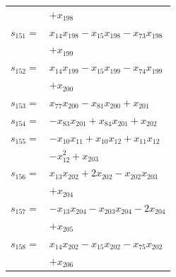 \begin{longtable}{@{}r@{\;}l@{}}
 & \(\displaystyle +x_{198}\) \\[3pt]
\(s_{151}=\) & \(\displaystyle x_{14}x_{198} -x_{15}x_{198} -x_{73}x_{198}\) \\
 & \(\displaystyle +x_{199}\) \\[3pt]
\(s_{152}=\) & \(\displaystyle x_{14}x_{199} -x_{15}x_{199} -x_{74}x_{199}\) \\
 & \(\displaystyle +x_{200}\) \\[3pt]
\(s_{153}=\) & \(\displaystyle x_{77}x_{200} -x_{81}x_{200} +x_{201}\) \\[3pt]
\(s_{154}=\) & \(\displaystyle -x_{83}x_{201} +x_{84}x_{201} +x_{202}\) \\[3pt]
\(s_{155}=\) & \(\displaystyle -x_{10}x_{11} +x_{10}x_{12} +x_{11}x_{12}\) \\
 & \(\displaystyle -x_{12}^{2} +x_{203}\) \\[3pt]
\(s_{156}=\) & \(\displaystyle x_{13}x_{202} +2x_{202} -x_{202}x_{203}\) \\
 & \(\displaystyle +x_{204}\) \\[3pt]
\(s_{157}=\) & \(\displaystyle -x_{13}x_{204} -x_{203}x_{204} -2x_{204}\) \\
 & \(\displaystyle +x_{205}\) \\[3pt]
\(s_{158}=\) & \(\displaystyle x_{14}x_{202} -x_{15}x_{202} -x_{75}x_{202}\) \\
 & \(\displaystyle +x_{206}\) \\[3pt]
\end{longtable}
\endgroup

